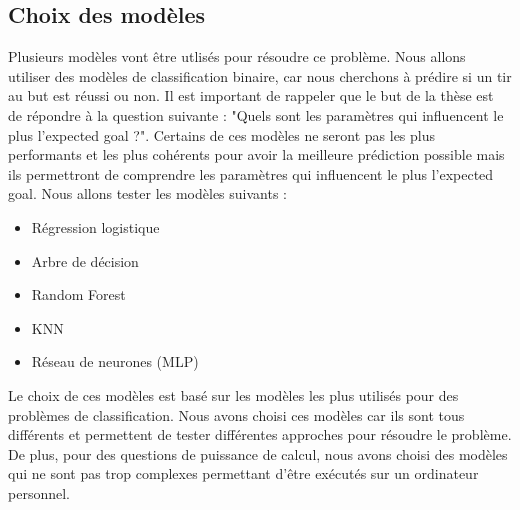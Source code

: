 \documentclass[12pt]{article}
\begin{document}
\subsection{Choix des modèles}
Plusieurs modèles vont être utlisés pour résoudre ce problème.
Nous allons utiliser des modèles de classification binaire, car nous cherchons à prédire si un tir au but est réussi ou non.
Il est important de rappeler que le but de la thèse est de répondre à la question suivante : "Quels sont les paramètres qui influencent le plus l'expected goal ?".
Certains de ces modèles ne seront pas les plus performants et les plus cohérents pour avoir la meilleure prédiction possible mais ils permettront de comprendre les paramètres qui influencent le plus l'expected goal.
Nous allons tester les modèles suivants :
\begin{itemize}
    \item Régression logistique
    \item Arbre de décision
    \item Random Forest
    \item KNN
    \item Réseau de neurones (MLP)
\end{itemize}
Le choix de ces modèles est basé sur les modèles les plus utilisés pour des problèmes de classification.
Nous avons choisi ces modèles car ils sont tous différents et permettent de tester différentes approches pour résoudre le problème.
De plus, pour des questions de puissance de calcul, nous avons choisi des modèles qui ne sont pas trop complexes permettant d'être exécutés sur un ordinateur personnel.
\end{document}
